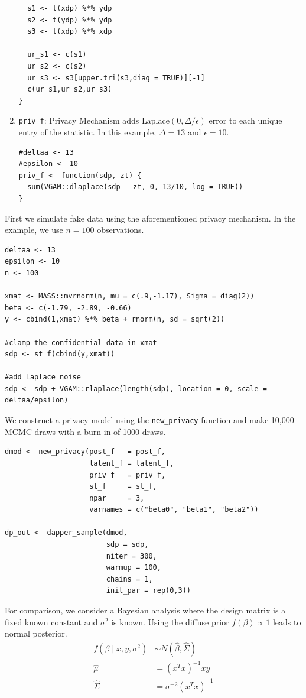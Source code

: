 \begin{enumerate}
\begin{verbatim}
  s1 <- t(xdp) %*% ydp
  s2 <- t(ydp) %*% ydp
  s3 <- t(xdp) %*% xdp

  ur_s1 <- c(s1)
  ur_s2 <- c(s2)
  ur_s3 <- s3[upper.tri(s3,diag = TRUE)][-1]
  c(ur_s1,ur_s2,ur_s3)
}
\end{verbatim}
\item
  \texttt{priv\_f}: Privacy Mechanism
  adds Laplace\((0, \Delta/\epsilon)\) error to each unique entry
  of the statistic. In this example, \(\Delta = 13\) and \(\epsilon = 10\).

\begin{verbatim}
#deltaa <- 13
#epsilon <- 10
priv_f <- function(sdp, zt) {
  sum(VGAM::dlaplace(sdp - zt, 0, 13/10, log = TRUE))
}
\end{verbatim}
\end{enumerate}

First we simulate fake data using the aforementioned privacy mechanism.
In the example, we use \(n = 100\) observations.

\begin{verbatim}
deltaa <- 13
epsilon <- 10
n <- 100

xmat <- MASS::mvrnorm(n, mu = c(.9,-1.17), Sigma = diag(2))
beta <- c(-1.79, -2.89, -0.66)
y <- cbind(1,xmat) %*% beta + rnorm(n, sd = sqrt(2))

#clamp the confidential data in xmat
sdp <- st_f(cbind(y,xmat))

#add Laplace noise 
sdp <- sdp + VGAM::rlaplace(length(sdp), location = 0, scale = deltaa/epsilon)
\end{verbatim}

We construct a privacy model using the \texttt{new\_privacy} function and
make 10,000 MCMC draws with a burn in of 1000 draws.

\begin{verbatim}
dmod <- new_privacy(post_f   = post_f,
                    latent_f = latent_f,
                    priv_f   = priv_f,
                    st_f     = st_f,
                    npar     = 3,
                    varnames = c("beta0", "beta1", "beta2"))

dp_out <- dapper_sample(dmod,
                        sdp = sdp,
                        niter = 300,
                        warmup = 100,
                        chains = 1,
                        init_par = rep(0,3))
\end{verbatim}

For comparison, we consider a Bayesian analysis where the design matrix
is a fixed known constant and \(\sigma^2\) is known. Using the
diffuse prior \(f(\beta) \propto 1\) leads to normal posterior.
\[
\begin{aligned}
f(\beta \mid x,y, \sigma^2) &\sim N(\hat{\beta}, \hat{\Sigma})\\
\hat{\mu} &= (x^Tx)^{-1}xy\\
\hat{\Sigma} &= \sigma^{-2}(x^Tx)^{-1}
\end{aligned}
\]

